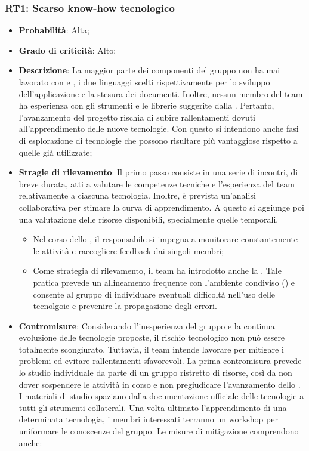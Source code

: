 \subsubsection{RT1: Scarso know-how tecnologico}
\begin{itemize}
    \item \textbf{Probabilità}: Alta;
    \item \textbf{Grado di criticità}: Alto;
    \item \textbf{Descrizione}: La maggior parte dei componenti del gruppo non ha mai lavorato con  e , i due linguaggi scelti rispettivamente per lo sviluppo dell'applicazione e la stesura dei documenti. Inoltre, nessun membro del team ha esperienza con gli strumenti e le librerie suggerite dalla . Pertanto, l'avanzamento del progetto rischia di subire rallentamenti dovuti all'apprendimento delle nuove tecnologie. Con questo si intendono anche fasi di esplorazione di tecnologie che possono risultare più vantaggiose rispetto a quelle già utilizzate;
    \item \textbf{Stragie di rilevamento}: Il primo passo consiste in una serie di incontri, di breve durata, atti a valutare le competenze tecniche e l'esperienza del team relativamente a ciascuna tecnologia. Inoltre, è prevista un'analisi collaborativa per stimare la curva di apprendimento. A questo si aggiunge poi una valutazione delle risorse disponibili, specialmente quelle temporali.
    \begin{itemize}
        \item Nel corso dello , il responsabile si impegna a monitorare constantemente le attività e raccogliere feedback dai singoli membri;
        \item Come strategia di rilevamento, il team ha introdotto anche la . Tale pratica prevede un allineamento frequente con l'ambiente condiviso () e consente al gruppo di individuare eventuali difficoltà nell'uso delle tecnolgoie e prevenire la propagazione degli errori. 
    \end{itemize}
    \item \textbf{Contromisure}: Considerando l'inesperienza del gruppo e la continua evoluzione delle tecnologie proposte, il rischio tecnologico non può essere totalmente scongiurato. Tuttavia, il team intende lavorare per mitigare i problemi ed evitare rallentamenti sfavorevoli. La prima contromisura prevede lo studio individuale da parte di un gruppo ristretto di risorse, così da non dover sospendere le attività in corso e non pregiudicare l'avanzamento dello . I materiali di studio spaziano dalla documentazione ufficiale delle tecnologie a tutti gli strumenti collaterali. Una volta ultimato l'apprendimento di una determinata tecnologia, i membri interessati terranno un workshop per uniformare le conoscenze del gruppo. Le misure di mitigazione comprendono anche:

\end{itemize}
